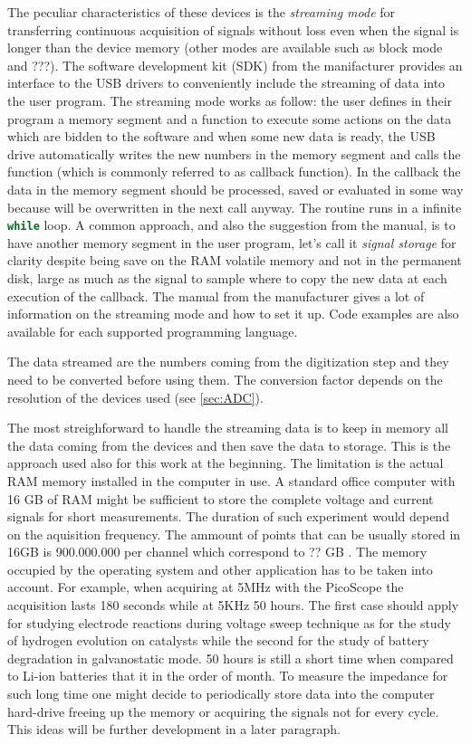 The peculiar characteristics of these devices is the \emph{streaming mode} for transferring continuous acquisition of signals without loss even when the signal is longer than the device memory (other modes are available such as block mode and ???). 
The software development kit (SDK) from the manifacturer provides an interface to the USB drivers to conveniently include the streaming of data into the user program. The streaming mode works as follow: the user defines in their program a memory segment and a function to execute some actions on the data which are bidden to the software and when some new data is ready, the USB drive automatically writes the new numbers in the memory segment and calls the function (which is commonly referred to as callback function). In the callback the data in the memory segment should be processed, saved or evaluated in some way because will be overwritten in the next call anyway.
The routine runs in a infinite \lstinline[language=Python]{while} loop.
A common approach, and also the suggestion from the manual, is to have another memory segment in the user program, let's call it \emph{signal storage} for clarity despite being save on the RAM volatile memory and not in the permanent disk, large as much as the signal to sample where to copy the new data at each execution of the callback. The manual from the manufacturer gives a lot of information on the streaming mode and how to set it up. Code examples are also available for each supported programming language.

The data streamed are the numbers coming from the digitization step and they need to be converted before using them. The conversion factor depends on the resolution of the devices used (see \ref{sec:ADC}).

The most streighforward to handle the streaming data is to keep in memory all the data coming from the devices and then save the data to storage. This is the approach used also for this work at the beginning. The limitation is the actual RAM memory installed in the computer in use. A standard office computer with 16 GB of RAM might be sufficient to store the complete voltage and current signals for short measurements. The duration of such experiment would depend on the aquisition frequency. The ammount of points that can be usually stored in 16GB is 900.000.000 per channel which correspond to ?? GB . The memory occupied by the operating system and other application has to be taken into account. For example, when acquiring at 5MHz with the PicoScope the acquisition lasts 180 seconds while at 5KHz 50 hours. The first case should apply for studying electrode reactions during voltage sweep technique as for the study of hydrogen evolution on catalysts while the second for the study of battery degradation in galvanostatic mode. 50 hours is still a short time when compared to Li-ion batteries that it in the order of month. To measure the impedance for such long time one might decide to periodically store data into the computer hard-drive freeing up the memory or acquiring the signals not for every cycle. This ideas will be further development in a later paragraph.




